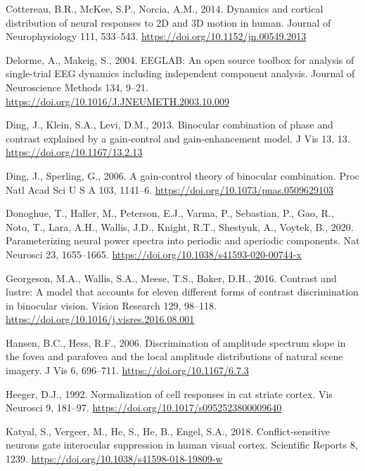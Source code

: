 \documentclass[review,
  12pt,
]{elsarticle}
\newlength{\cslhangindent}
\newenvironment{CSLReferences}[2] %
 {\begin{list}{}{%
  \setlength{\itemindent}{0pt}
  \setlength{\leftmargin}{0pt}
  \setlength{\parsep}{0pt}
  \ifodd #1
   \setlength{\leftmargin}{\cslhangindent}
   \setlength{\itemindent}{-1\cslhangindent}
  \fi
  \setlength{\itemsep}{#2\baselineskip}}}
 {\end{list}}
\begin{document}
\begin{CSLReferences}{1}{0}
Cottereau, B.R., McKee, S.P., Norcia, A.M., 2014. Dynamics and cortical
distribution of neural responses to 2D and 3D motion in human. Journal
of Neurophysiology 111, 533--543.
\url{https://doi.org/10.1152/jn.00549.2013}

Delorme, A., Makeig, S., 2004. EEGLAB: An open source toolbox for
analysis of single-trial EEG dynamics including independent component
analysis. Journal of Neuroscience Methods 134, 9--21.
\url{https://doi.org/10.1016/J.JNEUMETH.2003.10.009}

Ding, J., Klein, S.A., Levi, D.M., 2013. Binocular combination of phase
and contrast explained by a gain-control and gain-enhancement model. J
Vis 13, 13. \url{https://doi.org/10.1167/13.2.13}

Ding, J., Sperling, G., 2006. A gain-control theory of binocular
combination. Proc Natl Acad Sci U S A 103, 1141--6.
\url{https://doi.org/10.1073/pnas.0509629103}

Donoghue, T., Haller, M., Peterson, E.J., Varma, P., Sebastian, P., Gao,
R., Noto, T., Lara, A.H., Wallis, J.D., Knight, R.T., Shestyuk, A.,
Voytek, B., 2020. Parameterizing neural power spectra into periodic and
aperiodic components. Nat Neurosci 23, 1655--1665.
\url{https://doi.org/10.1038/s41593-020-00744-x}

Georgeson, M.A., Wallis, S.A., Meese, T.S., Baker, D.H., 2016. Contrast
and lustre: A model that accounts for eleven different forms of contrast
discrimination in binocular vision. Vision Research 129, 98--118.
\url{https://doi.org/10.1016/j.visres.2016.08.001}

Hansen, B.C., Hess, R.F., 2006. Discrimination of amplitude spectrum
slope in the fovea and parafovea and the local amplitude distributions
of natural scene imagery. J Vis 6, 696--711.
\url{https://doi.org/10.1167/6.7.3}

Heeger, D.J., 1992. Normalization of cell responses in cat striate
cortex. Vis Neurosci 9, 181--97.
\url{https://doi.org/10.1017/s0952523800009640}

Katyal, S., Vergeer, M., He, S., He, B., Engel, S.A., 2018.
Conflict-sensitive neurons gate interocular suppression in human visual
cortex. Scientific Reports 8, 1239.
\url{https://doi.org/10.1038/s41598-018-19809-w}


\end{CSLReferences}
\end{document}
